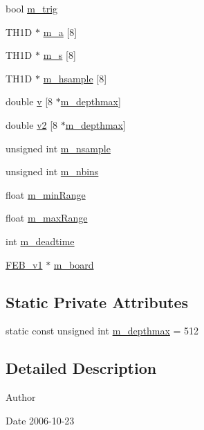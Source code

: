 \begin{DoxyCompactItemize}
bool \hyperlink{classAcquisition_a953bdc1bf56206b6df33b648af32a24f}{m\+\_\+trig}
\item 
T\+H1D $\ast$ \hyperlink{classAcquisition_aedfd2a4842b08fdf85176bf672030430}{m\+\_\+a} \mbox{[}8\mbox{]}
\item 
T\+H1D $\ast$ \hyperlink{classAcquisition_ad7f531c3d3fc58d1a2a5eab954db0ca7}{m\+\_\+s} \mbox{[}8\mbox{]}
\item 
T\+H1D $\ast$ \hyperlink{classAcquisition_ad0078b0c53eb14f13fdd16763df3be8e}{m\+\_\+hsample} \mbox{[}8\mbox{]}
\item 
double \hyperlink{classAcquisition_ac855680c9bb5f8f14d505d5f41f1a076}{v} \mbox{[}8 $\ast$\hyperlink{classAcquisition_a82cdfc89b37f20530bf112e13a5c5e5c}{m\+\_\+depthmax}\mbox{]}
\item 
double \hyperlink{classAcquisition_a8d2cd605d4982223356a14423d735c84}{v2} \mbox{[}8 $\ast$\hyperlink{classAcquisition_a82cdfc89b37f20530bf112e13a5c5e5c}{m\+\_\+depthmax}\mbox{]}
\item 
unsigned int \hyperlink{classAcquisition_a26d0f1a44309ffac49c365b7ee568ab2}{m\+\_\+nsample}
\item 
unsigned int \hyperlink{classAcquisition_a05bccdc4b9ada37beaeba8794ccef12d}{m\+\_\+nbins}
\item 
float \hyperlink{classAcquisition_a06b3ea027ebdcb15f64a6517ceb99b76}{m\+\_\+min\+Range}
\item 
float \hyperlink{classAcquisition_a45478629e9db582470b4b158edb46616}{m\+\_\+max\+Range}
\item 
int \hyperlink{classAcquisition_a5f7fe20506e7d860ed61935255adfe17}{m\+\_\+deadtime}
\item 
\hyperlink{classFEB__v1}{F\+E\+B\+\_\+v1} $\ast$ \hyperlink{classAcquisition_ad4820003ddd62f0ca886c2e6a3690120}{m\+\_\+board}
\end{DoxyCompactItemize}
\subsection*{Static Private Attributes}
\begin{DoxyCompactItemize}
\item 
static const unsigned int \hyperlink{classAcquisition_a82cdfc89b37f20530bf112e13a5c5e5c}{m\+\_\+depthmax} = 512
\end{DoxyCompactItemize}


\subsection{Detailed Description}
\begin{DoxyAuthor}{Author}

\end{DoxyAuthor}
\begin{DoxyDate}{Date}
2006-\/10-\/23 
\end{DoxyDate}


